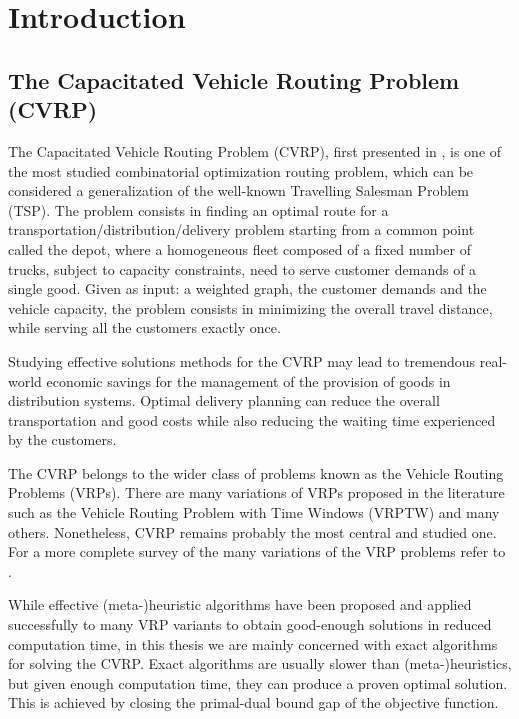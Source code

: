 \chapter{Introduction}
\label{sec:introduction-chapter}

\section{The Capacitated Vehicle Routing Problem (CVRP)}
\label{sec:intro-cvrp-problem}

The Capacitated Vehicle Routing Problem (CVRP), first presented in \textcite{dantzig1959},
is one of the most studied combinatorial optimization routing problem,
which can be considered a generalization of the well-known Travelling Salesman Problem (TSP).
The problem consists in finding an optimal route for a transportation/distribution/delivery problem
starting from a common point called the depot,
where a homogeneous fleet composed of a fixed number of trucks, subject to capacity constraints,
need to serve customer demands of a single good.
Given as input: a weighted graph, the customer demands and the vehicle capacity,
the problem consists in minimizing the overall travel distance,
while serving all the customers exactly once.

Studying effective solutions methods for the CVRP may lead to tremendous real-world economic
savings for the management of the provision of goods in distribution systems.
Optimal delivery planning can reduce the overall transportation and good costs while
also reducing the waiting time experienced by the customers.


The CVRP belongs to the wider class of problems known as the Vehicle Routing Problems (VRPs).
There are many variations of VRPs proposed in the literature such as
the Vehicle Routing Problem with Time Windows (VRPTW) and many others.
Nonetheless, CVRP remains probably the most central and studied one.
For a more complete survey of the many variations of the VRP problems refer to \cite{poggi2014}.

While effective (meta-)heuristic algorithms have been proposed and applied
successfully to many VRP variants to obtain good-enough solutions
in reduced computation time, in this thesis we are mainly concerned
with exact algorithms for solving the CVRP.
Exact algorithms are usually slower than (meta-)heuristics, but given
enough computation time, they can produce a proven optimal solution.
This is achieved by closing the primal-dual bound gap of the objective function.


